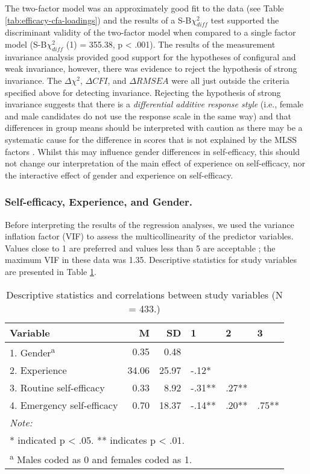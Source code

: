 \documentclass[
  12pt,
  a4paper,
]{book}
\begin{document}
The two-factor model was an approximately good fit to the data (see Table \ref{tab:efficacy-cfa-loadings}) and the results of a S-B\(\chi^2_{diff}\) test supported the discriminant validity of the two-factor model when compared to a single factor model (S-B\(\chi^2_{diff}\) (1) = 355.38, p \textless{} .001). The results of the measurement invariance analysis provided good support for the hypotheses of configural and weak invariance, however, there was evidence to reject the hypothesis of strong invariance. The \(\Delta\chi^2\), \(\Delta CFI\), and \(\Delta RMSEA\) were all just outside the criteria specified above for detecting invariance. Rejecting the hypothesis of strong invariance suggests that there is a \emph{differential additive response style} (i.e., female and male candidates do not use the response scale in the same way) and that differences in group means should be interpreted with caution as there may be a systematic cause for the difference in scores that is not explained by the MLSS factors \citep{Kline2016}. Whilst this may influence gender differences in self-efficacy, this should not change our interpretation of the main effect of experience on self-efficacy, nor the interactive effect of gender and experience on self-efficacy.

\hypertarget{self-efficacy-experience-and-gender.}{%
\subsubsection{Self-efficacy, Experience, and Gender.}\label{self-efficacy-experience-and-gender.}}

Before interpreting the results of the regression analyses, we used the variance inflation factor (VIF) to assess the multicollinearity of the predictor variables. Values close to 1 are preferred and values less than 5 are acceptable \citep{Tabachnick2007a}; the maximum VIF in these data was 1.35. Descriptive statistics for study variables are presented in Table \ref{tab:var-cor}.

\begin{table}[H]

\caption{\label{tab:var-cor}Descriptive statistics and correlations between study variables (N = 433.)}
\centering
\begin{tabular}[t]{lrrlll}
\toprule
Variable & M & SD & 1 & 2 & 3\\
\midrule
1. Gender\textsuperscript{a} & 0.35 & 0.48 &  &  & \\
2. Experience & 34.06 & 25.97 & -.12* &  & \\
3. Routine self-efficacy & 0.33 & 8.92 & -.31** & .27** & \\
4. Emergency self-efficacy & 0.70 & 18.37 & -.14** & .20** & .75**\\
\bottomrule
\multicolumn{6}{l}{\textit{Note: }}\\
\multicolumn{6}{l}{* indicated p < .05. ** indicates p < .01.}\\
\multicolumn{6}{l}{\textsuperscript{a} Males coded as 0 and females coded as 1.}\\
\end{tabular}
\end{table}
\end{document}
